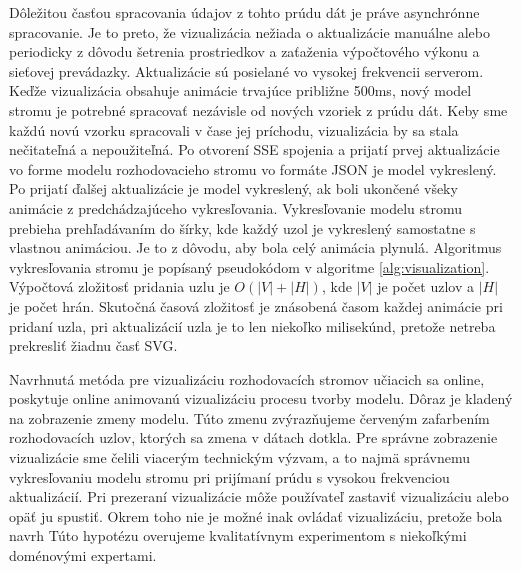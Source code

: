 Dôležitou časťou spracovania údajov z tohto prúdu dát je práve asynchrónne spracovanie. Je to preto, že vizualizácia nežiada o aktualizácie manuálne alebo periodicky z dôvodu šetrenia prostriedkov a zaťaženia výpočtového výkonu a sieťovej prevádazky. Aktualizácie sú posielané vo vysokej frekvencii serverom. Keďže vizualizácia obsahuje animácie trvajúce približne 500ms, nový model stromu je potrebné spracovať nezávisle od nových vzoriek z prúdu dát. Keby sme každú novú vzorku spracovali v čase jej príchodu, vizualizácia by sa stala nečitateľná a nepoužiteľná. Po otvorení SSE spojenia a prijatí prvej aktualizácie vo forme modelu rozhodovacieho stromu vo formáte JSON je model vykreslený. Po prijatí ďalšej aktualizácie je model vykreslený, ak boli ukončené všeky animácie z predchádzajúceho vykresľovania. Vykresľovanie modelu stromu prebieha prehľadávaním do šírky, kde každý uzol je vykreslený samostatne s vlastnou animáciou. Je to z dôvodu, aby bola celý animácia plynulá. Algoritmus vykresľovania stromu je popísaný pseudokódom v algoritme \ref{alg:visualization}. Výpočtová zložitosť pridania uzlu je $O(|V| + |H|)$, kde $|V|$ je počet uzlov a $|H|$ je počet hrán. Skutočná časová zložitosť je znásobená časom každej animácie pri pridaní uzla, pri aktualizácií uzla je to len niekoľko milisekúnd, pretože netreba prekresliť žiadnu časť SVG.
\par
Navrhnutá metóda pre vizualizáciu rozhodovacích stromov učiacich sa online, poskytuje online animovanú vizualizáciu procesu tvorby modelu. Dôraz je kladený na zobrazenie zmeny modelu. Túto zmenu zvýrazňujeme červeným zafarbením rozhodovacích uzlov, ktorých sa zmena v dátach dotkla. Pre správne zobrazenie vizualizácie sme čelili viacerým technickým výzvam, a to najmä správnemu vykresľovaniu modelu stromu pri prijímaní prúdu s vysokou frekvenciou aktualizácií. Pri prezeraní vizualizácie môže používateľ zastaviť vizualizáciu alebo opäť ju spustiť. Okrem toho nie je možné inak ovládať vizualizáciu, pretože bola navrh
 Túto hypotézu overujeme kvalitatívnym experimentom s niekoľkými doménovými expertami.
\par
